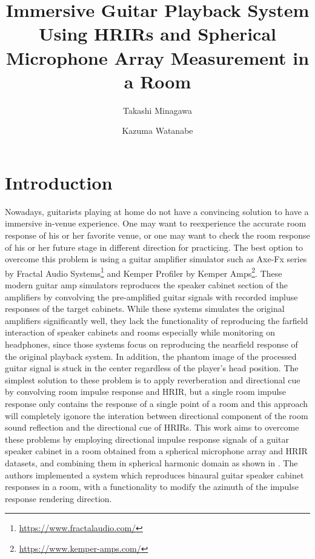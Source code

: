 \documentclass[convention,e-brief]{aesconf-current}
\title{ Immersive Guitar Playback System Using HRIRs and Spherical Microphone Array Measurement in a Room}
\author[1]{Takashi Minagawa}
\author[1]{Kazuma Watanabe}
\affil[1]{Graduate School of Design, Kyushu University}
\begin{document}

\section{Introduction}

Nowadays, guitarists playing at home do not have a convincing solution to have a immersive in-venue experience.
One may want to reexperience the accurate room response of his or her favorite venue, or one may want to check the room response of his or her future stage in different direction for practicing.
The best option to overcome this problem is using a guitar amplifier simulator such as Axe-Fx series by Fractal Audio Systems\footnote{\url{https://www.fractalaudio.com/}} and Kemper Profiler by Kemper Amps\footnote{\url{https://www.kemper-amps.com/}}.
These modern guitar amp simulators reproduces the speaker cabinet section of the amplifiers by convolving the pre-amplified guitar signals with recorded impluse responses of the target cabinets.
While these systems simulates the original amplifiers significantly well, they lack the functionality of reproducing the farfield interaction of speaker cabinets and rooms especially while monitoring on headphones, since those systems focus on reproducing the nearfield response of the original playback system.
In addition, the phantom image of the processed guitar signal is stuck in the center regardless of the player's head position.
The simplest solution to these problem is to apply reverberation and directional cue by convolving room impulse response and HRIR, but a single room impulse response only contains the response of a single point of a room and this approach will completely igonore the interation between directional component of the room sound reflection and the directional cue of HRIRs.
This work aims to overcome these problems by employing directional impulse response signals of a guitar speaker cabinet in a room obtained from a spherical microphone array and HRIR datasets, and combining them in spherical harmonic domain as shown in \cite{Andersson2017-qg}.
The authors implemented a system which reproduces binaural guitar speaker cabinet responses in a room, with a functionality to modify the azimuth of the impulse response rendering direction.
\end{document}
